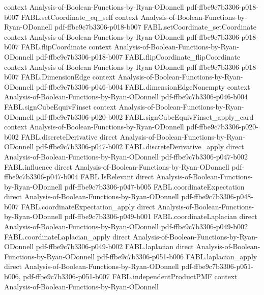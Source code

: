 \begin{theorem}
  {context}
  {Analysis-of-Boolean-Functions-by-Ryan-ODonnell}
  {pdf-ffbe9c7b3306-p018-b007}
\proofstep
  {FABL.setCoordinate_eq_self}
  {context}
  {Analysis-of-Boolean-Functions-by-Ryan-ODonnell}
  {pdf-ffbe9c7b3306-p018-b007}
\proofstep
  {FABL.setCoordinate_setCoordinate}
  {context}
  {Analysis-of-Boolean-Functions-by-Ryan-ODonnell}
  {pdf-ffbe9c7b3306-p018-b007}
\proofstep
  {FABL.flipCoordinate}
  {context}
  {Analysis-of-Boolean-Functions-by-Ryan-ODonnell}
  {pdf-ffbe9c7b3306-p018-b007}
\proofstep
  {FABL.flipCoordinate_flipCoordinate}
  {context}
  {Analysis-of-Boolean-Functions-by-Ryan-ODonnell}
  {pdf-ffbe9c7b3306-p018-b007}
\proofstep
  {FABL.DimensionEdge}
  {context}
  {Analysis-of-Boolean-Functions-by-Ryan-ODonnell}
  {pdf-ffbe9c7b3306-p046-b004}
\proofstep
  {FABL.dimensionEdgeNonempty}
  {context}
  {Analysis-of-Boolean-Functions-by-Ryan-ODonnell}
  {pdf-ffbe9c7b3306-p046-b004}
\proofstep
  {FABL.signCubeEquivFinset}
  {context}
  {Analysis-of-Boolean-Functions-by-Ryan-ODonnell}
  {pdf-ffbe9c7b3306-p020-b002}
\proofstep
  {FABL.signCubeEquivFinset_apply_card}
  {context}
  {Analysis-of-Boolean-Functions-by-Ryan-ODonnell}
  {pdf-ffbe9c7b3306-p020-b002}
\proofstep
  {FABL.discreteDerivative}
  {direct}
  {Analysis-of-Boolean-Functions-by-Ryan-ODonnell}
  {pdf-ffbe9c7b3306-p047-b002}
\proofstep
  {FABL.discreteDerivative_apply}
  {direct}
  {Analysis-of-Boolean-Functions-by-Ryan-ODonnell}
  {pdf-ffbe9c7b3306-p047-b002}
\proofstep
  {FABL.influence}
  {direct}
  {Analysis-of-Boolean-Functions-by-Ryan-ODonnell}
  {pdf-ffbe9c7b3306-p047-b004}
\proofstep
  {FABL.IsRelevant}
  {direct}
  {Analysis-of-Boolean-Functions-by-Ryan-ODonnell}
  {pdf-ffbe9c7b3306-p047-b005}
\proofstep
  {FABL.coordinateExpectation}
  {direct}
  {Analysis-of-Boolean-Functions-by-Ryan-ODonnell}
  {pdf-ffbe9c7b3306-p048-b007}
\proofstep
  {FABL.coordinateExpectation_apply}
  {direct}
  {Analysis-of-Boolean-Functions-by-Ryan-ODonnell}
  {pdf-ffbe9c7b3306-p049-b001}
\proofstep
  {FABL.coordinateLaplacian}
  {direct}
  {Analysis-of-Boolean-Functions-by-Ryan-ODonnell}
  {pdf-ffbe9c7b3306-p049-b002}
\proofstep
  {FABL.coordinateLaplacian_apply}
  {direct}
  {Analysis-of-Boolean-Functions-by-Ryan-ODonnell}
  {pdf-ffbe9c7b3306-p049-b002}
\proofstep
  {FABL.laplacian}
  {direct}
  {Analysis-of-Boolean-Functions-by-Ryan-ODonnell}
  {pdf-ffbe9c7b3306-p051-b006}
\proofstep
  {FABL.laplacian_apply}
  {direct}
  {Analysis-of-Boolean-Functions-by-Ryan-ODonnell}
  {pdf-ffbe9c7b3306-p051-b006,
    pdf-ffbe9c7b3306-p051-b007}
\proofstep
  {FABL.independentProductPMF}
  {context}
  {Analysis-of-Boolean-Functions-by-Ryan-ODonnell}

\end{theorem}
